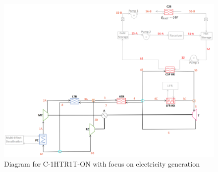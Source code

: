 \begin{figure}[H] 
    \widefigure
    \includegraphics[width=\linewidth]{Definitions/c-1htr1t-on.pdf}
    \caption{Diagram for C-1HTR1T-ON with focus on electricity generation\label{c-1htr1t-on}}
\end{figure}


